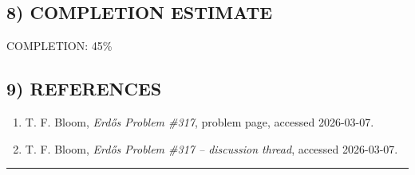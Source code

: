 \subsection*{8) COMPLETION ESTIMATE}
COMPLETION: 45\%

\subsection*{9) REFERENCES}
\begin{enumerate}
\item T. F. Bloom, \emph{Erd\H{o}s Problem \#317}, problem page, accessed 2026-03-07.
\item T. F. Bloom, \emph{Erd\H{o}s Problem \#317 -- discussion thread}, accessed 2026-03-07.
\end{enumerate}

\bigskip
\hrule
\bigskip

